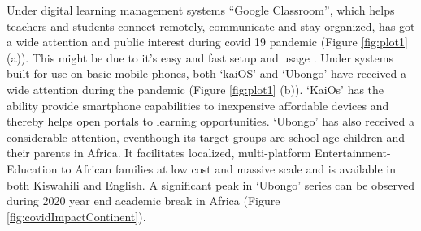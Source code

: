 \documentclass[11pt,a4paper,]{article}
\begin{document}
Under digital learning management systems ``Google Classroom'', which helps teachers and students connect remotely, communicate and stay-organized, has got a wide attention and public interest during covid 19 pandemic (Figure \ref{fig:plot1} (a)). This might be due to it's easy and fast setup and usage \autocite{sudarsana2019use}. Under systems built for use on basic mobile phones, both `kaiOS' and `Ubongo' have received a wide attention during the pandemic (Figure \ref{fig:plot1} (b)).
`KaiOs' has the ability provide smartphone capabilities to inexpensive affordable devices and thereby helps open portals to learning opportunities. `Ubongo' has also received a considerable attention, eventhough its target groups are school-age children and their parents in Africa. It facilitates localized, multi-platform Entertainment-Education to African families at low cost and massive scale and is available in both Kiswahili and English. A significant peak in `Ubongo' series can be observed during 2020 year end academic break in Africa (Figure \ref{fig:covidImpactContinent}).
\end{document}
